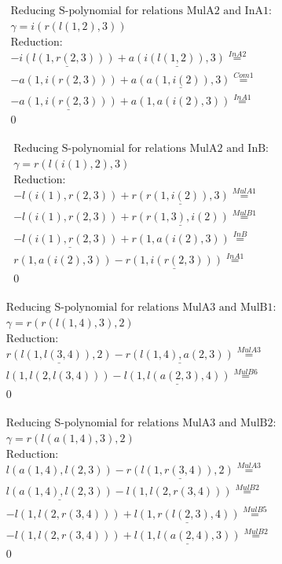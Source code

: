 \documentclass[11pt]{amsart}
\begin{document}
\begin{align*} 
& \text{Reducing S-polynomial for relations MulA2 and InA1:} \\ 
& \gamma = i(r(l(1,2),3)) \\ 
& \text{Reduction}: \\& - \underline{i(l(1,r(2,3)))} + \underline{a(i(l(1,2)),3)} \stackrel{ InA2 }{=}  \\ 
& - a(1,i(r(2,3))) + \underline{a(a(1,i(2)),3)} \stackrel{ Com1 }{=}  \\ 
& - \underline{a(1,i(r(2,3)))} + a(1,a(i(2),3)) \stackrel{ InA1 }{=}  \\ 
&0\\ 
\end{align*} 
 
\begin{align*} 
& \text{Reducing S-polynomial for relations MulA2 and InB:} \\ 
& \gamma = r(l(i(1),2),3) \\ 
& \text{Reduction}: \\& - l(i(1),r(2,3)) + \underline{r(r(1,i(2)),3)} \stackrel{ MulA1 }{=}  \\ 
& - l(i(1),r(2,3)) + \underline{r(r(1,3),i(2))} \stackrel{ MulB1 }{=}  \\ 
& - \underline{l(i(1),r(2,3))} + r(1,a(i(2),3)) \stackrel{ InB }{=}  \\ 
&r(1,a(i(2),3)) - \underline{r(1,i(r(2,3)))} \stackrel{ InA1 }{=}  \\ 
&0\\ 
\end{align*} 
 
\begin{align*} 
& \text{Reducing S-polynomial for relations MulA3 and MulB1:} \\ 
& \gamma = r(r(l(1,4),3),2) \\ 
& \text{Reduction}: \\&\underline{r(l(1,l(3,4)),2)} - \underline{r(l(1,4),a(2,3))} \stackrel{ MulA3 }{=}  \\ 
&l(1,l(2,l(3,4))) - \underline{l(1,l(a(2,3),4))} \stackrel{ MulB6 }{=}  \\ 
&0\\ 
\end{align*} 
 
\begin{align*} 
& \text{Reducing S-polynomial for relations MulA3 and MulB2:} \\ 
& \gamma = r(l(a(1,4),3),2) \\ 
& \text{Reduction}: \\&l(a(1,4),l(2,3)) - \underline{r(l(1,r(3,4)),2)} \stackrel{ MulA3 }{=}  \\ 
&\underline{l(a(1,4),l(2,3))} - l(1,l(2,r(3,4))) \stackrel{ MulB2 }{=}  \\ 
& - l(1,l(2,r(3,4))) + \underline{l(1,r(l(2,3),4))} \stackrel{ MulB5 }{=}  \\ 
& - l(1,l(2,r(3,4))) + \underline{l(1,l(a(2,4),3))} \stackrel{ MulB2 }{=}  \\ 
&0\\ 
\end{align*} 
 
\end{document}
